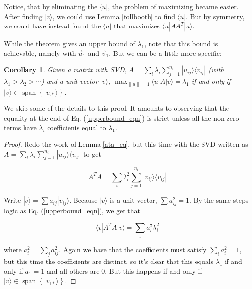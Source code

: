 \documentclass{amsbook}
\newtheorem{corollary}[theorem]{Corollary}
\begin{document}
Notice, that by eliminating the $\langle u|$, the problem of maximizing became easier.  After finding $|v\rangle$, we could use Lemma \ref{tollbooth} to find $\langle u|$.  But by symmetry, we could have instead found the $\langle u|$ that maximizes $\langle u|AA^T|u\rangle$.

While the theorem gives an upper bound of $\lambda_1$, note that this bound is achievable, namely with $\vec u_1$ and $\vec v_1$.  But we can be a little more specific:

\begin{corollary}
\label{corollary1}
Given a matrix with SVD, $A=\sum_i\lambda_i\sum_{j=1}^{n_i}|u_{ij}\rangle\langle v_{ij}|$ (with $\lambda_1>\lambda_2>\cdots$) and a unit vector $|v\rangle$, $\max_{\|u\|=1}\langle u|A|v\rangle=\lambda_1$ if and only if $|v\rangle\in\operatorname{span}\left\{|v_{i*}\rangle\right\}$.
\end{corollary}

We skip some of the details to this proof.  It amounts to observing that the equality at the end of Eq. (\ref{upperbound_eqn}) is strict unless all the non-zero terms have $\lambda_i$ coefficients equal to $\lambda_1$.

\begin{proof}
Redo the work of Lemma \ref{ata_eq}, but this time with the SVD written as $A=\sum_i\lambda_i\sum_{j=1}^{n_i}|u_{ij}\rangle\langle v_{ij}|$ to get

$$
A^TA=\sum_i\lambda_i^2\sum_{j=1}^{n_i}|v_{ij}\rangle\langle v_{ij}|
$$

Write $|v\rangle=\sum a_{ij}|v_{ij}\rangle$.  Because $|v\rangle$ is a unit vector, $\sum a_{ij}^2=1$.  By the same steps logic as Eq. (\ref{upperbound_eqn}), we get that

$$
\langle v|A^TA|v\rangle = \sum_ia_i^2\lambda_i^2
$$

where $a_i^2=\sum_ja_{ij}^2$.  Again we have that the coefficients must satisfy $\sum_ia_i^2=1$, but this time the coefficients are distinct, so it's clear that this equals $\lambda_1$ if and only if $a_1=1$ and all others are $0$.  But this happens if and only if $|v\rangle\in\operatorname{span}\left\{|v_{1*}\rangle\right\}$.

\end{proof}
\end{document}
